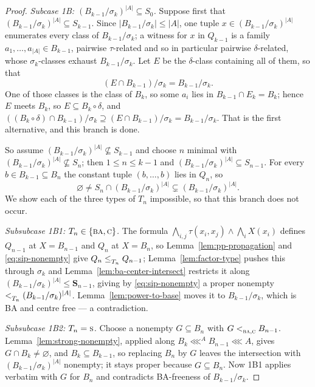 \begin{proof}
\emph{Subcase 1B: $(B_{k-1}/\sigma_{k})^{|A|}\subseteq S_{0}$.} Suppose first
that $(B_{k-1}/\sigma_{k})^{|A|}\subseteq S_{k-1}$. Since $|B_{k-1}/\sigma_{k}|
\le|A|$, one tuple $x\in(B_{k-1}/\sigma_{k})^{|A|}$ enumerates every class of
$B_{k-1}/\sigma_{k}$; a witness for $x$ in $Q_{k-1}$ is a family
$a_{1},\dots,a_{|A|}\in B_{k-1}$, pairwise $\tau$-related and so in particular
pairwise $\delta$-related, whose $\sigma_{k}$-classes exhaust
$B_{k-1}/\sigma_{k}$. Let $E$ be the $\delta$-class containing all of them, so
that
\[
  (E\cap B_{k-1})/\sigma_{k}=B_{k-1}/\sigma_{k}.
\]
One of those classes is the class of $B_{k}$, so some $a_{i}$ lies in
$B_{k-1}\cap E_{k}=B_{k}$; hence $E$ meets $B_{k}$, so
$E\subseteq B_{k}\circ\delta$, and
$((B_{k}\circ\delta)\cap B_{k-1})/\sigma_{k}\supseteq(E\cap B_{k-1})/\sigma_{k}
=B_{k-1}/\sigma_{k}$. That is the first alternative, and this branch is done.

So assume $(B_{k-1}/\sigma_{k})^{|A|}\not\subseteq S_{k-1}$ and choose $n$
minimal with $(B_{k-1}/\sigma_{k})^{|A|}\not\subseteq S_{n}$; then
$1\le n\le k-1$ and $(B_{k-1}/\sigma_{k})^{|A|}\subseteq S_{n-1}$. For every
$b\in B_{k-1}\subseteq B_{n}$ the constant tuple $(b,\dots,b)$ lies in
$Q_{n}$, so
\begin{equation}\label{eq:sip-nonempty}
  \varnothing\neq S_{n}\cap(B_{k-1}/\sigma_{k})^{|A|}
  \subsetneq(B_{k-1}/\sigma_{k})^{|A|} .
\end{equation}
We show each of the three types of $T_{n}$ impossible, so that this branch does
not occur.

\emph{Subsubcase 1B1: $T_{n}\in\{\textup{\textsc{ba}},\textup{\textsc{c}}\}$.} The formula
$\bigwedge_{i,j}\tau(x_{i},x_{j})\wedge\bigwedge_{i}X(x_{i})$ defines
$Q_{n-1}$ at $X=B_{n-1}$ and $Q_{n}$ at $X=B_{n}$, so
Lemma~\ref{lem:pp-propagation} and \eqref{eq:sip-nonempty} give
$Q_{n}\le_{T_{n}}^{}Q_{n-1}$; Lemma~\ref{lem:factor-type} pushes this through
$\sigma_{k}$ and Lemma~\ref{lem:ba-center-intersect} restricts it along
$(B_{k-1}/\sigma_{k})^{|A|}\le\mathbf S_{n-1}$, giving by
\eqref{eq:sip-nonempty} a proper nonempty
$<_{T_{n}}^{}(B_{k-1}/\sigma_{k})^{|A|}$. Lemma~\ref{lem:power-to-base} moves
it to $B_{k-1}/\sigma_{k}$, which is BA and centre free --- a contradiction.

\emph{Subsubcase 1B2: $T_{n}=\textup{\textsc{s}}$.} Choose a nonempty $G\subseteq B_{n}$ with
$G<_{\textup{\textsc{ba}},\textup{\textsc{c}}}^{}B_{n-1}$. Lemma~\ref{lem:strong-nonempty}, applied along
$B_{k}\lll^{A}B_{n-1}\lll A$, gives $G\cap B_{k}\neq\varnothing$, and
$B_{k}\subseteq B_{k-1}$, so replacing $B_{n}$ by $G$ leaves the intersection
with $(B_{k-1}/\sigma_{k})^{|A|}$ nonempty; it stays proper because
$G\subseteq B_{n}$. Now 1B1 applies verbatim with $G$ for $B_{n}$ and
contradicts BA-freeness of $B_{k-1}/\sigma_{k}$.


\end{proof}
